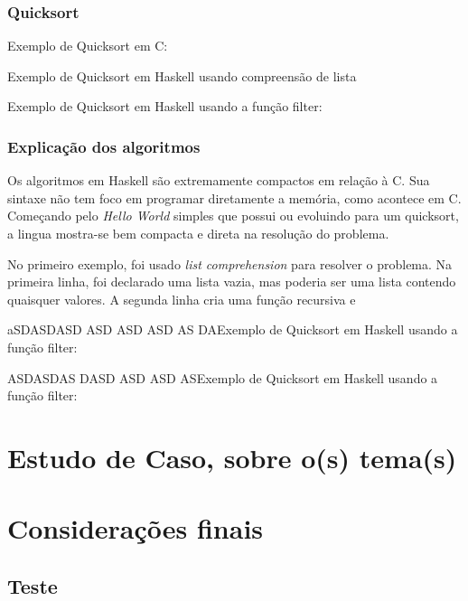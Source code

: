\documentclass[
	article,			%
	11pt,				%
	oneside,			%
	a4paper,			%
	english,			%
	brazil,				%
	sumario=tradicional
	]{abntex2}
\begin{document}
    \subsection*{Quicksort}
      Exemplo de Quicksort em C: \newline
      
      Exemplo de Quicksort em Haskell usando compreensão de lista \newline
            
      Exemplo de Quicksort em Haskell usando a função filter: \newline
      

      \subsection*{Explicação dos algoritmos}
      Os algoritmos em Haskell são extremamente compactos em relação à C. Sua sintaxe não tem foco
      em programar diretamente a memória, como acontece em C. Começando pelo \emph{Hello World} simples que possui ou evoluindo
      para um quicksort, a lingua mostra-se bem compacta e direta na resolução do problema.

      No primeiro exemplo, foi usado \emph{list comprehension} para resolver o problema. Na primeira linha,
      foi declarado uma lista vazia, mas poderia ser uma lista contendo quaisquer valores. A segunda linha
      cria uma função recursiva e 

      aSDASDASD ASD ASD ASD AS DAExemplo de Quicksort em Haskell usando a função filter: \newline
      
      ASDASDAS DASD ASD ASD ASExemplo de Quicksort em Haskell usando a função filter: \newline
      

    \chapter{Estudo de Caso, sobre o(s) tema(s)}
    \chapter{Considerações finais}

    \begin{apendicesenv}

        \partapendices
        \chapter{Teste}
    
    \end{apendicesenv}
\end{document}
